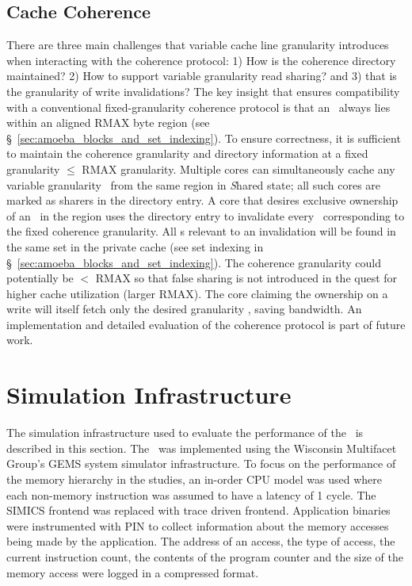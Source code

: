 
\subsection{Cache Coherence}
\label{sec:coherence}

There are three main challenges that variable cache line granularity introduces when interacting with the coherence protocol: 1) How is the coherence directory maintained? 2) How to support variable granularity read sharing? and 3) that is the granularity of write invalidations? The key insight that ensures compatibility with a conventional fixed-granularity coherence protocol is that an \AB\ always lies within an aligned RMAX byte region (see \S~\ref{sec:amoeba_blocks_and_set_indexing}). To ensure correctness, it is sufficient to maintain the coherence granularity and directory information at a fixed granularity $\leq$ RMAX granularity. Multiple cores can simultaneously cache any variable granularity \AB\ from the same region in \textit{S}hared state; all such cores are marked as sharers in the directory entry. A core that desires exclusive ownership of an \AB\ in the region uses the directory entry to invalidate every \AB\ corresponding to the fixed coherence granularity. All \AB{}s relevant to an invalidation will be found in the same set in the private cache (see set indexing in \S~\ref{sec:amoeba_blocks_and_set_indexing}). The coherence granularity could potentially be $<$ RMAX so that false sharing is not introduced in the quest  for higher cache utilization (larger RMAX). The core claiming the ownership on a write will itself fetch only the desired granularity \AB{}, saving bandwidth. An implementation and detailed evaluation of the coherence protocol is part of future work.

\section{Simulation Infrastructure}

The simulation infrastructure used to evaluate the performance of the \AC\ is described in this section. The \AC\ was implemented using the Wisconsin Multifacet Group's GEMS\cite{Martin:2005:MGE:1105734.1105747} system simulator infrastructure. To focus on the performance of the memory hierarchy in the studies, an in-order CPU model was used where each non-memory instruction was assumed to have a latency of 1 cycle. The SIMICS frontend was replaced with trace driven frontend. Application binaries were instrumented with PIN\cite{Luk:2005:PBC:1065010.1065034} to collect information about the memory accesses being made by the application. The address of an access, the type of access, the current instruction count, the contents of the program counter and the size of the memory access were logged in a compressed format. 

